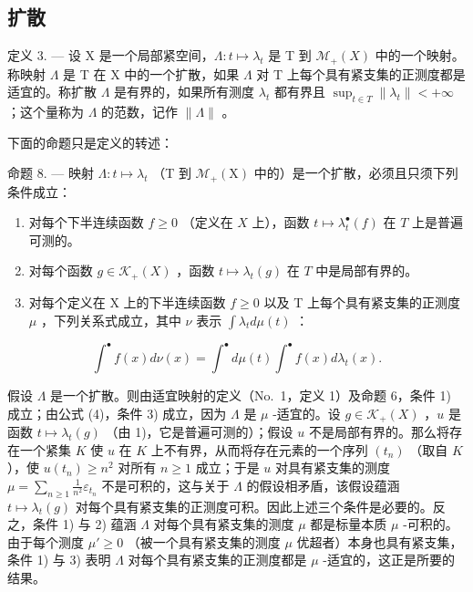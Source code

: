 \subsection{扩散}

定义 3. --- 设 X 是一个局部紧空间，\(\Lambda : t \mapsto \lambda_t\) 是 T 到 \(\mathcal{M}_{+}(X)\) 中的一个映射。称映射 \(\Lambda\) 是 T 在 X 中的一个扩散，如果 \(\Lambda\) 对 T 上每个具有紧支集的正测度都是适宜的。称扩散 \(\Lambda\) 是有界的，如果所有测度 \(\lambda_{t}\) 都有界且 \(\sup_{t\in T}\|\lambda_{t}\|<+\infty\) ；这个量称为 \(\Lambda\) 的范数，记作 \(\|\Lambda\|\) 。

下面的命题只是定义的转述：

命题 8. --- 映射 \(\Lambda: t \mapsto \lambda_t\) （T 到 \(\mathcal{M}_+(\mathrm{X})\) 中的）是一个扩散，必须且只须下列条件成立：

\begin{enumerate}
\def\labelenumi{\arabic{enumi})}
\item
  对每个下半连续函数 \(f \geqslant 0\) （定义在 \(X\) 上），函数 \(t \mapsto \lambda_t^\bullet(f)\) 在 \(T\) 上是普遍可测的。
\item
  对每个函数 \(g \in \mathcal{K}_{+}(X)\) ，函数 \(t \mapsto \lambda_t(g)\) 在 \(T\) 中是局部有界的。
\item
  对每个定义在 X 上的下半连续函数 \(f \geqslant 0\) 以及 T 上每个具有紧支集的正测度 \(\mu\) ，下列关系式成立，其中 \(\nu\) 表示 \(\int \lambda_{t} d\mu(t)\) ：
\end{enumerate}

\[
\int^ {\bullet} f (x) d \nu (x) = \int^ {\bullet} d \mu (t) \int^ {\bullet} f (x) d \lambda_ {t} (x).\tag{12}
\]

假设 \(\Lambda\) 是一个扩散。则由适宜映射的定义（No.~1，定义 1）及命题 6，条件 1) 成立；由公式 (4)，条件 3) 成立，因为 \(\Lambda\) 是 \(\mu\) -适宜的。设 \(g \in \mathcal{K}_{+}(X)\) ，\(u\) 是函数 \(t \mapsto \lambda_t(g)\) （由 1)，它是普遍可测的）；假设 \(u\) 不是局部有界的。那么将存在一个紧集 \(K\) 使 \(u\) 在 \(K\) 上不有界，从而将存在元素的一个序列 \((t_n)\) （取自 \(K\) ），使 \(u(t_n) \geqslant n^2\) 对所有 \(n \geqslant 1\) 成立；于是 \(u\) 对具有紧支集的测度 \(\mu = \sum_{n \geqslant 1} \frac{1}{n^2} \varepsilon_{t_n}\) 不是可积的，这与关于 \(\Lambda\) 的假设相矛盾，该假设蕴涵 \(t \mapsto \lambda_t(g)\) 对每个具有紧支集的正测度可积。因此上述三个条件是必要的。反之，条件 1) 与 2) 蕴涵 \(\Lambda\) 对每个具有紧支集的测度 \(\mu\) 都是标量本质 \(\mu\) -可积的。由于每个测度 \(\mu' \geqslant 0\) （被一个具有紧支集的测度 \(\mu\) 优超者）本身也具有紧支集，条件 1) 与 3) 表明 \(\Lambda\) 对每个具有紧支集的正测度都是 \(\mu\) -适宜的，这正是所要的结果。

